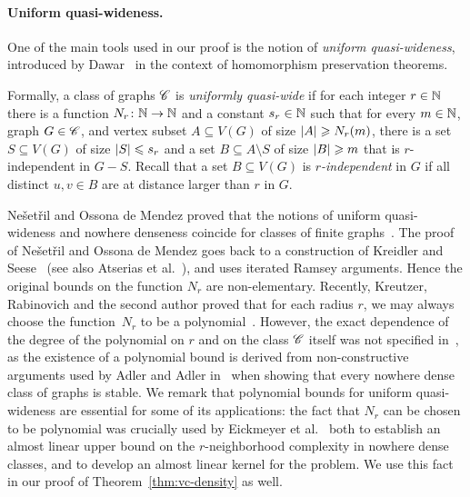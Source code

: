 \paragraph{Uniform quasi-wideness.}
One of the main tools used in our proof is the notion of \emph{uniform
  quasi-wideness}, introduced by Dawar~\cite{Dawar07} in the context
of homomorphism preservation theorems.

\smallskip Formally, a class of graphs $\mathscr{C}$ is \emph{uniformly
  quasi-wide} if for each integer $r\in\mathbb{N}$ there is a function
$N_r\colon \mathbb{N}\rightarrow \mathbb{N}$ and a constant $s_r\in \mathbb{N}$ such that for
every $m\in \mathbb{N}$, graph $G\in \mathscr{C}$, and vertex subset
$A\subseteq V(G)$ of size $\left\lvert A\right\rvert\geqslant N_r(m)$, there is a set
$S\subseteq V(G)$ of size $\left\lvert S\right\rvert\leqslant s_r$ and a set
$B\subseteq A\setminus S$ of size $\left\lvert B\right\rvert\geqslant m$ that is
$r$-independent in $G-S$. Recall that a set $B\subseteq V(G)$ is
{\em{$r$-independent}} in $G$ if all distinct $u,v\in B$ are at
distance larger than $r$ in $G$.

\smallskip

Ne\v{s}et\v{r}il and Ossona de Mendez proved that the notions of
uniform quasi-wideness and nowhere denseness coincide for classes of
finite graphs~\cite{nevsetvril2011nowhere}.  The proof of
Ne\v{s}et\v{r}il and Ossona de Mendez goes back to a construction of
Kreidler and Seese~\cite{kreidler1998monadic} (see also Atserias et
al.~\cite{atserias2006preservation}), and uses iterated Ramsey
arguments. Hence the original bounds on the function $N_r$ are
non-elementary. Recently, Kreutzer, Rabinovich and the second author
proved that for each radius $r$, we may always choose the
function~$N_r$ to be a polynomial~\cite{siebertz2016polynomial}.
However, the exact dependence of the degree of the polynomial on $r$
and on the class $\mathscr{C}$ itself was not specified
in~\cite{siebertz2016polynomial}, as the existence of a polynomial
bound is derived from non-constructive arguments used by Adler and
Adler in~\cite{adler2014interpreting} when showing that every nowhere
dense class of graphs is stable. We remark that polynomial bounds for
uniform quasi-wideness are essential for some of its applications: the
fact that $N_r$ can be chosen to be polynomial was crucially used by
Eickmeyer et al.~\cite{eickmeyer2016neighborhood} both to establish an
almost linear upper bound on the $r$-neighborhood complexity in
nowhere dense classes, and to develop an almost linear kernel for the
{} problem.  We use this fact in our proof of
Theorem~\ref{thm:vc-density} as well.

